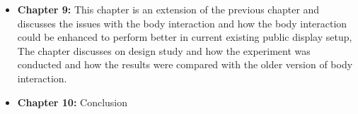 \begin{itemize}
\item \textbf{Chapter 9:}
This chapter is an extension of the previous chapter and discusses the issues with the body interaction and how the body interaction could be enhanced to perform better in current existing public display setup, The chapter discusses on design study and how the experiment was conducted and how the results were compared with the older version of body interaction. 


\item \textbf{Chapter 10:}
Conclusion

\end{itemize}

